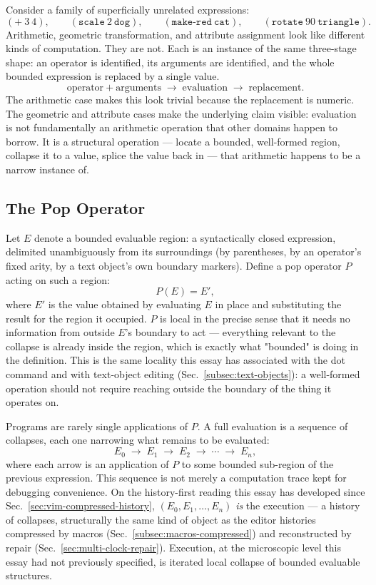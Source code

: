 \documentclass[12pt,a4paper]{article}
\theoremstyle{plain}
\theoremstyle{definition}
\theoremstyle{remark}
\begin{document}
Consider a family of superficially unrelated expressions:
\[
(\texttt{+}\ 3\ 4), \qquad (\texttt{scale}\ 2\ \texttt{dog}), \qquad (\texttt{make-red}\ \texttt{cat}), \qquad (\texttt{rotate}\ 90\ \texttt{triangle}).
\]
Arithmetic, geometric transformation, and attribute assignment look like different kinds of computation. They are not. Each is an instance of the same three-stage shape: an operator is identified, its arguments are identified, and the whole bounded expression is replaced by a single value.
\[
\text{operator} + \text{arguments} \;\longrightarrow\; \text{evaluation} \;\longrightarrow\; \text{replacement}.
\]
The arithmetic case makes this look trivial because the replacement is numeric. The geometric and attribute cases make the underlying claim visible: evaluation is not fundamentally an arithmetic operation that other domains happen to borrow. It is a structural operation — locate a bounded, well-formed region, collapse it to a value, splice the value back in — that arithmetic happens to be a narrow instance of.

\subsection{The Pop Operator}
\label{subsec:pop-operator}

Let $E$ denote a bounded evaluable region: a syntactically closed expression, delimited unambiguously from its surroundings (by parentheses, by an operator's fixed arity, by a text object's own boundary markers). Define a pop operator $P$ acting on such a region:
\[
P(E) = E',
\]
where $E'$ is the value obtained by evaluating $E$ in place and substituting the result for the region it occupied. $P$ is local in the precise sense that it needs no information from outside $E$'s boundary to act — everything relevant to the collapse is already inside the region, which is exactly what "bounded" is doing in the definition. This is the same locality this essay has associated with the dot command and with text-object editing (Sec.~\ref{subsec:text-objects}): a well-formed operation should not require reaching outside the boundary of the thing it operates on.

Programs are rarely single applications of $P$. A full evaluation is a sequence of collapses, each one narrowing what remains to be evaluated:
\[
E_0 \;\to\; E_1 \;\to\; E_2 \;\to\; \cdots \;\to\; E_n,
\]
where each arrow is an application of $P$ to some bounded sub-region of the previous expression. This sequence is not merely a computation trace kept for debugging convenience. On the history-first reading this essay has developed since Sec.~\ref{sec:vim-compressed-history}, $(E_0, E_1, \ldots, E_n)$ \emph{is} the execution — a history of collapses, structurally the same kind of object as the editor histories compressed by macros (Sec.~\ref{subsec:macros-compressed}) and reconstructed by repair (Sec.~\ref{sec:multi-clock-repair}). Execution, at the microscopic level this essay had not previously specified, is iterated local collapse of bounded evaluable structures.
\end{document}
